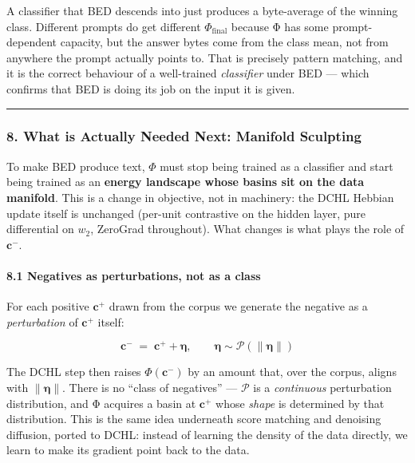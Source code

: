 \documentclass[
  11pt,
  a4paper,
]{article}
\begin{document}
A classifier that BED descends into just produces a byte-average of the
winning class. Different prompts do get different
\(\Phi_{\text{final}}\) because Φ has some prompt-dependent capacity,
but the answer bytes come from the class mean, not from anywhere the
prompt actually points to. That is precisely pattern matching, and it is
the correct behaviour of a well-trained \emph{classifier} under BED ---
which confirms that BED is doing its job on the input it is given.

\begin{center}\rule{0.5\linewidth}{0.5pt}\end{center}

\subsubsection{8. What is Actually Needed Next: Manifold
Sculpting}\label{what-is-actually-needed-next-manifold-sculpting}

To make BED produce text, \(\Phi\) must stop being trained as a
classifier and start being trained as an \textbf{energy landscape whose
basins sit on the data manifold}. This is a change in objective, not in
machinery: the DCHL Hebbian update itself is unchanged (per-unit
contrastive on the hidden layer, pure differential on \(w_2\), ZeroGrad
throughout). What changes is what plays the role of \(\mathbf{c}^{-}\).

\paragraph{8.1 Negatives as perturbations, not as a
class}\label{negatives-as-perturbations-not-as-a-class}

For each positive \(\mathbf{c}^{+}\) drawn from the corpus we generate
the negative as a \emph{perturbation} of \(\mathbf{c}^{+}\) itself:

\[
\mathbf{c}^{-} \;=\; \mathbf{c}^{+} + \boldsymbol{\eta}, \qquad \boldsymbol{\eta} \sim \mathcal{P}(\lVert \boldsymbol{\eta} \rVert)
\]

The DCHL step then raises \(\Phi(\mathbf{c}^{-})\) by an amount that,
over the corpus, aligns with \(\lVert \boldsymbol{\eta} \rVert\). There
is no ``class of negatives'' --- \(\mathcal{P}\) is a \emph{continuous}
perturbation distribution, and Φ acquires a basin at \(\mathbf{c}^{+}\)
whose \emph{shape} is determined by that distribution. This is the same
idea underneath score matching and denoising diffusion, ported to DCHL:
instead of learning the density of the data directly, we learn to make
its gradient point back to the data.
\end{document}
